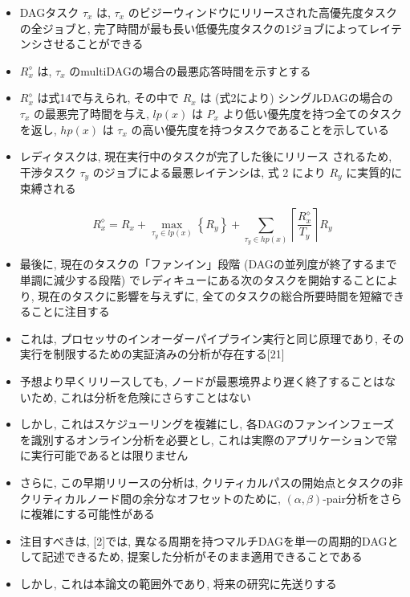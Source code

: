 \begin{frame}{}
    \begin{itemize}
        \item DAGタスク $\tau_{x}$ は, $\tau_{x}$ のビジーウィンドウにリリースされた高優先度タスクの全ジョブと, 完了時間が最も長い低優先度タスクの1ジョブによってレイテンシさせることができる
        \item $R_{x}^{\diamond}$ は, $\tau_{x}$ のmultiDAGの場合の最悪応答時間を示すとする
        \item $R_{x}^{\diamond}$ は式14で与えられ, その中で $R_{x}$ は (式2により) シングルDAGの場合の $\tau_{x}$ の最悪完了時間を与え, $l p(x)$ は $P_{x}$ より低い優先度を持つ全てのタスクを返し, $h p(x)$ は $\tau_{x}$ の高い優先度を持つタスクであることを示している
        \item レディタスクは, 現在実行中のタスクが完了した後にリリース されるため, 干渉タスク $\tau_{y}$ のジョブによる最悪レイテンシは, 式 2 により $R_{y}$ に実質的に束縛される

              \begin{equation*}
                  R_{x}^{\diamond}=R_{x}+\max _{\tau_{y} \in l p(x)}\left\{R_{y}\right\}+\sum_{\tau_{y} \in h p(x)}\left\lceil\frac{R_{x}^{\diamond}}{T_{y}}\right\rceil R_{y}
              \end{equation*}
    \end{itemize}
\end{frame}

\begin{frame}{}
    \begin{itemize}
        \item 最後に, 現在のタスクの「ファンイン」段階 (DAGの並列度が終了するまで単調に減少する段階) でレディキューにある次のタスクを開始することにより, 現在のタスクに影響を与えずに, 全てのタスクの総合所要時間を短縮できることに注目する
        \item これは, プロセッサのインオーダーパイプライン実行と同じ原理であり, その実行を制限するための実証済みの分析が存在する[21]
        \item 予想より早くリリースしても, ノードが最悪境界より遅く終了することはないため, これは分析を危険にさらすことはない
        \item しかし, これはスケジューリングを複雑にし, 各DAGのファンインフェーズを識別するオンライン分析を必要とし, これは実際のアプリケーションで常に実行可能であるとは限りません
        \item さらに, この早期リリースの分析は, クリティカルパスの開始点とタスクの非クリティカルノード間の余分なオフセットのために, $(\alpha, \beta)$-pair分析をさらに複雑にする可能性がある
        \item 注目すべきは, [2]では, 異なる周期を持つマルチDAGを単一の周期的DAGとして記述できるため, 提案した分析がそのまま適用できることである
        \item しかし, これは本論文の範囲外であり, 将来の研究に先送りする
    \end{itemize}
\end{frame}
